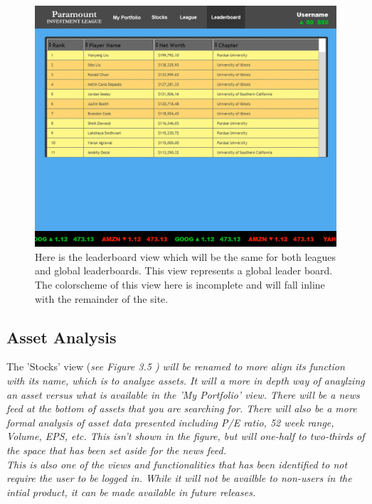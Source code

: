 \begin{figure}
\centering
\includegraphics[width=5.5in]{./img/mock/leaderboard.jpg}
\caption{Here is the leaderboard view which will be the same for both leagues and global
leaderboards. This view represents a global leader board.  The colorscheme of this view
here is incomplete and will fall inline with the remainder of the site.}
\end{figure}

\subsection{Asset Analysis}
The 'Stocks' view (\em see Figure 3.5 \em) will be renamed to more align its function
with its name, which is to analyze assets. It will a more in depth way of anaylzing an
asset versus what is available in the 'My Portfolio' view.  There will be a news feed
at the bottom of assets that you are searching for. There will also be a more formal
analysis of asset data presented including P/E ratio, 52 week range, Volume, EPS, etc.
This isn't shown in the figure, but will one-half to two-thirds of the space that
has been set aside for the news feed.\\

This is also one of the views and functionalities that has been identified to not require
the user to be logged in.  While it will not be availble to non-users in the intial product,
it can be made available in future releases.\\

